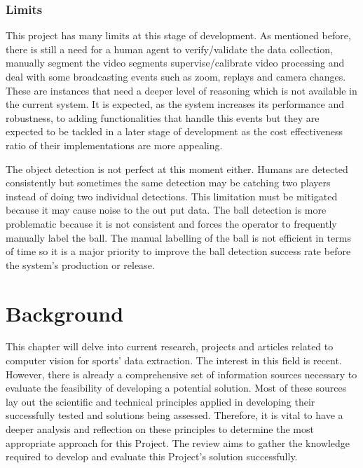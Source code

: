 \documentclass[
11pt,
twoside
]{report}
\begin{document}
\subsection{Limits}


This project has many limits at this stage of development. As mentioned before, there is still a need for a human agent to verify/validate the data collection, manually segment the video segments supervise/calibrate video processing and deal with some broadcasting events such as zoom, replays and camera changes. These are instances that need a deeper level of reasoning which is not available in the current system. It is expected, as the system increases its performance and robustness, to adding functionalities that handle this events but they are expected to be tackled in a later stage of development as the cost effectiveness ratio of their implementations are more appealing.


The object detection is not perfect at this moment either. Humans are detected consistently but sometimes the same detection may be catching two players instead of doing two individual detections. This limitation must be mitigated because it may cause noise to the out put data. The ball detection is more problematic because it is not consistent and forces the operator to frequently manually label the ball. The manual labelling of the ball is not efficient in terms of time so it is a major priority to improve the ball detection success rate before the system's production or release.

\chapter{Background}


This chapter will delve into current research, projects and articles related to computer vision for sports' data extraction. The interest in this field is recent. However, there is already a comprehensive set of information sources necessary to evaluate the feasibility of developing a potential solution. Most of these sources lay out the scientific and technical principles applied in developing their successfully tested and solutions being assessed. Therefore, it is vital to have a deeper analysis and reflection on these principles to determine the most appropriate approach for this Project. The review aims to gather the knowledge required to develop and evaluate this Project's solution successfully.
\end{document}

